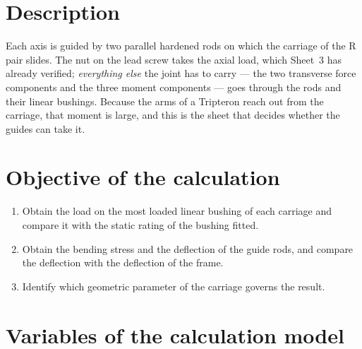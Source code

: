 \documentclass[11pt]{article}
\def\calculo{ }
\def\nombre{Group 2}
\newcommand{\sheet}[2]{\clearpage\def\calculo{#1}\def\nombre{#2}}
\begin{document}
\sheet{Sheet 4 -- R-pair guides and carriages}{R. Bueno / G. Ria\~no / D. Zuluaga}
\section{Description}\label{sec:gui-desc}

Each axis is guided by two parallel hardened rods on which the carriage of the R
pair slides. The nut on the lead screw takes the axial load, which Sheet~3 has already
verified; \emph{everything else} the joint has to carry --- the two transverse force
components and the three moment components --- goes through the rods and their linear
bushings. Because the arms of a Tripteron reach out from the carriage, that moment is
large, and this is the sheet that decides whether the guides can take it.

\section{Objective of the calculation}\label{sec:gui-obj}

\begin{enumerate}[leftmargin=*,nosep]
  \item Obtain the load on the most loaded linear bushing of each carriage and compare it
        with the static rating of the bushing fitted.
  \item Obtain the bending stress and the deflection of the guide rods, and compare the
        deflection with the deflection of the frame.
  \item Identify which geometric parameter of the carriage governs the result.
\end{enumerate}

\section{Variables of the calculation model}\label{sec:gui-var}
\end{document}
